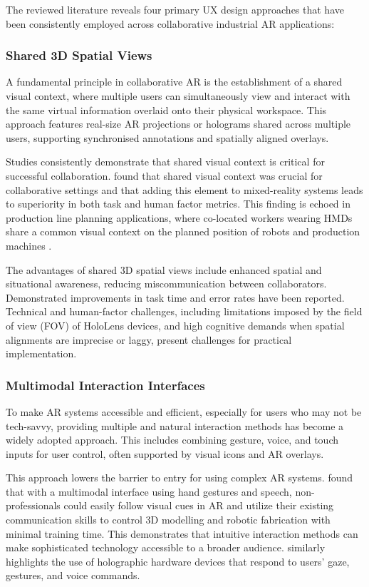 The reviewed literature reveals four primary UX design approaches that have been consistently employed across collaborative industrial AR applications:

\subsubsection{Shared 3D Spatial Views}

A fundamental principle in collaborative AR is the establishment of a shared visual context, where multiple users can simultaneously view and interact with the same virtual information overlaid onto their physical workspace. This approach features real-size AR projections or holograms shared across multiple users, supporting synchronised annotations and spatially aligned overlays.

Studies consistently demonstrate that shared visual context is critical for successful collaboration. \cite{aschenbrenner2019comparing} found that shared visual context was crucial for collaborative settings and that adding this element to mixed-reality systems leads to superiority in both task and human factor metrics. This finding is echoed in production line planning applications, where co-located workers wearing HMDs share a common visual context on the planned position of robots and production machines \cite{aschenbrenner2018collaborative}.

The advantages of shared 3D spatial views include enhanced spatial and situational awareness, reducing miscommunication between collaborators. Demonstrated improvements in task time and error rates have been reported. Technical and human-factor challenges, including limitations imposed by the field of view (FOV) of HoloLens devices, and high cognitive demands when spatial alignments are imprecise or laggy, present challenges for practical implementation.

\subsubsection{Multimodal Interaction Interfaces}

To make AR systems accessible and efficient, especially for users who may not be tech-savvy, providing multiple and natural interaction methods has become a widely adopted approach. This includes combining gesture, voice, and touch inputs for user control, often supported by visual icons and AR overlays.

This approach lowers the barrier to entry for using complex AR systems. \cite{betti2019pop} found that with a multimodal interface using hand gestures and speech, non-professionals could easily follow visual cues in AR and utilize their existing communication skills to control 3D modelling and robotic fabrication with minimal training time. This demonstrates that intuitive interaction methods can make sophisticated technology accessible to a broader audience. \cite{gemito2023mixed} similarly highlights the use of holographic hardware devices that respond to users' gaze, gestures, and voice commands.

